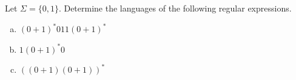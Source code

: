 \subsection{}

Let $\Sigma=\{0,1\}$. Determine the languages of the following regular expressions.

\begin{enumerate}[a.)]
\item $(0+1)^*011(0+1)^*$
\item $1(0+1)^*0$
\item $((0+1)(0+1))^*$
\end{enumerate}